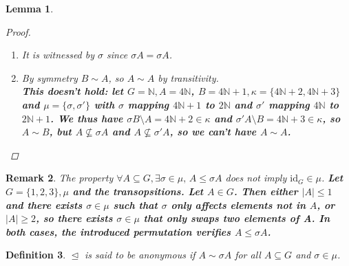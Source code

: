 \documentclass[11pt]{article}
\newcommand{\nouveau}[1]{{\small \color{blue} \bf  #1}}
\newtheorem{definition}{Definition}
\newtheorem{lemma}[definition]{Lemma}
\newtheorem{remark}[definition]{Remark}
\newcommand{\N}{\mathbb{N}}
\newcommand{\releq}{\mathrel{\trianglelefteq}}
\newcommand{\abs}[1]{\left| #1 \right|}
\begin{document}
\begin{lemma}
\begin{proof}
\begin{enumerate}
 \item It is witnessed by $\sigma$ since $\sigma A = \sigma A$.
 
 \item By symmetry $B \sim A$, so $A \sim A$ by transitivity.\\
     \nouveau{This doesn't hold: let \(G = \N, A = 4\N\), \(B = 4 \N + 1, \kappa
         = \{4\N+2, 4\N + 3\}\) and \(\mu = \{\sigma, \sigma'\} \) with
         \(\sigma\) mapping \(4\N + 1\) to \(2\N\) and  \(\sigma'\) mapping
         \(4\N\) to \(2\N + 1\). We thus have  \(\sigma B\setminus A = 4\N + 2
         \in \kappa\) and \(\sigma' A\setminus B = 4 \N + 3 \in \kappa\), so \(A
         \sim  B\), but \(A\not\subseteq \sigma A\) and \(A \not\subseteq
         \sigma' A\), so we can't have \(A \sim A\).
     }
 \end{enumerate}
\end{proof}
\end{lemma}



\begin{remark}
The property $\forall A \subseteq G, \exists \sigma \in \mu,\, A \leq \sigma A$
does not imply $\mathrm{id}_G \in \mu$. \nouveau{Let \(G = \{1,2,3\}, \mu\) and the
transopsitions. Let \(A\in G\). Then either \(\abs{A} \le 1\) and there exists
\(\sigma\in \mu\) such that \(\sigma\) only affects elements not in \(A\), or
\(\abs{A} \ge 2\), so there exists \(\sigma\in \mu\) that only swaps two
elements of A. In both cases, the introduced permutation verifies \(A \le \sigma
A\). }
\end{remark}



\begin{definition}
 $\releq$ is said to be anonymous if $A \sim \sigma A$ for all $A \subseteq G$ and $\sigma \in \mu$.
\end{definition}
\end{document}
